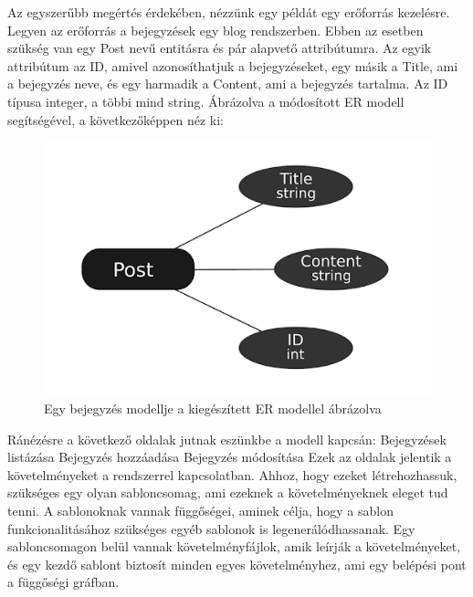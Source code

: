 \documentclass[a4paper,12pt,oneside]{report}
\begin{document}
\begin{justify}

	Az egyszerűbb megértés érdekében, nézzünk egy példát egy erőforrás kezelésre. Legyen az erőforrás a bejegyzések egy blog rendszerben. Ebben az esetben szükség van egy Post nevű entitásra és pár alapvető attribútumra. Az egyik attribútum az ID, amivel azonosíthatjuk a bejegyzéseket, egy másik a Title, ami a bejegyzés neve, és egy harmadik a Content, ami a bejegyzés tartalma. Az ID típusa integer, a többi mind string. Ábrázolva a módosított ER modell segítségével, a következőképpen néz ki:

	\begin{figure}[h]
		\includegraphics[width=\textwidth]{contents/images/post_ermodel.png}
		\caption{Egy bejegyzés modellje a kiegészített ER modellel ábrázolva}
		\label{fig:post_ermodel}
	\end{figure}

	Ránézésre a következő oldalak jutnak eszünkbe a modell kapcsán:
	Bejegyzések listázása
	Bejegyzés hozzáadása
	Bejegyzés módosítása
	Ezek az oldalak jelentik a követelményeket a rendszerrel kapcsolatban. Ahhoz, hogy ezeket létrehozhassuk, szükséges egy olyan sabloncsomag, ami ezeknek a követelményeknek eleget tud tenni. A sablonoknak vannak függőségei, aminek célja, hogy a sablon funkcionalitásához szükséges egyéb sablonok is legenerálódhassanak.  Egy sabloncsomagon belül vannak követelményfájlok, amik leírják a követelményeket, és egy kezdő sablont biztosít minden egyes követelményhez, ami egy belépési pont a függőségi gráfban.


\end{justify}
\end{document}
